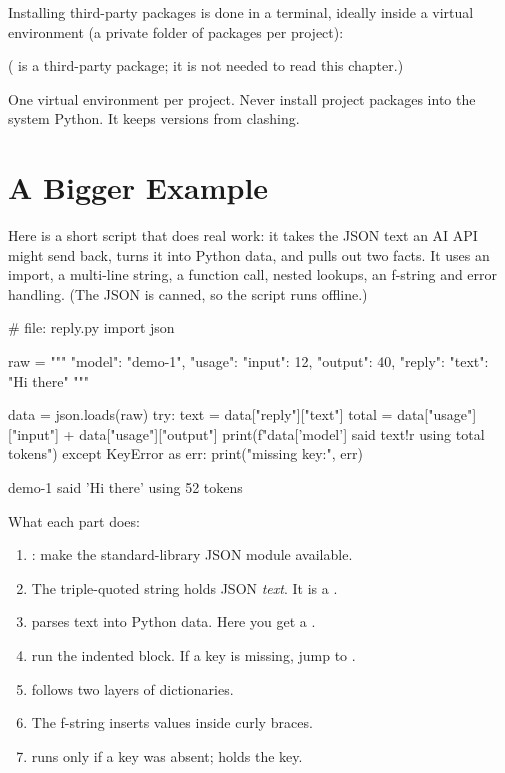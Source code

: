 Installing third-party packages is done in a terminal, ideally inside a virtual
environment (a private folder of packages per project):


( is a third-party package; it is not needed to read this chapter.)

\begin{gamerule}
One virtual environment per project. Never install project packages into the
system Python. It keeps versions from clashing.
\end{gamerule}

\section{A Bigger Example}

Here is a short script that does real work: it takes the JSON text an AI API might
send back, turns it into Python data, and pulls out two facts. It uses an import, a
multi-line string, a function call, nested lookups, an f-string and error handling.
(The JSON is canned, so the script runs offline.)

\begin{pycode}
# file: reply.py
import json

raw = """{
  "model": "demo-1",
  "usage": {"input": 12, "output": 40},
  "reply": {"text": "Hi there"}
}"""

data = json.loads(raw)
try:
    text = data["reply"]["text"]
    total = data["usage"]["input"] + data["usage"]["output"]
    print(f"{data['model']} said {text!r} using {total} tokens")
except KeyError as err:
    print("missing key:", err)
\end{pycode}
\begin{rawcode}
demo-1 said 'Hi there' using 52 tokens
\end{rawcode}

What each part does:

\begin{enumerate}[itemsep=1pt]
\item {}: make the standard-library JSON module available.
\item The triple-quoted string  holds JSON \emph{text}. It is a .
\item {} parses text into Python data. Here you get a .
\item {} run the indented block. If a key is missing, jump to .
\item {} follows two layers of dictionaries.
\item The f-string  inserts values inside curly braces.
\item {} runs only if a key was absent;  holds the key.
\end{enumerate}

